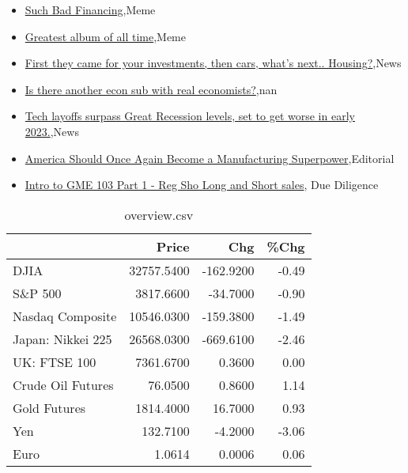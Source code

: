 \documentclass{article}%
\begin{document}
%
\begin{itemize}%
\item%
\href{https://reddit.com/r/wallstreetbets/comments/zqmwpk/such\_bad\_financing/}{Such Bad Financing},Meme%
\item%
\href{https://reddit.com/r/wallstreetbets/comments/zqmlko/greatest\_album\_of\_all\_time/}{Greatest album of all time},Meme%
\item%
\href{https://reddit.com/r/wallstreetbets/comments/zqm8ka/first\_they\_came\_for\_your\_investments\_then\_cars/}{First they came for your investments, then cars, what's next.. Housing?},News%
\item%
\href{https://reddit.com/r/Economics/comments/zqiqgj/is\_there\_another\_econ\_sub\_with\_real\_economists/}{Is there another econ sub with real economists?},nan%
\item%
\href{https://reddit.com/r/Economics/comments/zqhqcy/tech\_layoffs\_surpass\_great\_recession\_levels\_set/}{Tech layoffs surpass Great Recession levels, set to get worse in early 2023.},News%
\item%
\href{https://reddit.com/r/Economics/comments/zqh795/america\_should\_once\_again\_become\_a\_manufacturing/}{America Should Once Again Become a Manufacturing Superpower},Editorial%
\item%
\href{https://reddit.com/r/Superstonk/comments/zqmeuh/intro\_to\_gme\_103\_part\_1\_reg\_sho\_long\_and\_short/}{Intro to GME 103 Part 1 - Reg Sho Long and Short sales}, Due Diligence%
\end{itemize}%


\begin{table}[htbp]%
\caption{overview.csv}%
\centering%
\begin{adjustbox}{width=1\textwidth}%
\begin{tabular}{lrrr}
\toprule
                  &      Price &       Chg &  \%Chg \\
\midrule
             DJIA & 32757.5400 & -162.9200 & -0.49 \\
          S\&P 500 &  3817.6600 &  -34.7000 & -0.90 \\
 Nasdaq Composite & 10546.0300 & -159.3800 & -1.49 \\
Japan: Nikkei 225 & 26568.0300 & -669.6100 & -2.46 \\
     UK: FTSE 100 &  7361.6700 &    0.3600 &  0.00 \\
Crude Oil Futures &    76.0500 &    0.8600 &  1.14 \\
     Gold Futures &  1814.4000 &   16.7000 &  0.93 \\
              Yen &   132.7100 &   -4.2000 & -3.06 \\
             Euro &     1.0614 &    0.0006 &  0.06 \\
\bottomrule
\end{tabular}
%
\end{adjustbox}%
\end{table}
\end{document}
